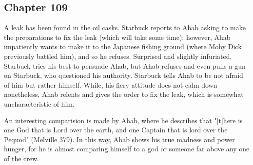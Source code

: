 \subsection{Chapter 109}

A leak has been found in the oil casks. Starbuck reports to Ahab asking
to make the preparations to fix the leak (which will take some time); however,
Ahab impatiently wants to make it to the Japanese fishing ground (where Moby
Dick previously battled him), and so he refuses. Surprised and slightly
infuriated, Starbuck tries his best to persuade Ahab, but Ahab refuses and even
pulls a gun on Starbuck, who questioned his authority. Starbuck tells Ahab to
be not afraid of him but rather himself. While, his fiery attitude does not
calm down nonetheless, Ahab relents and gives the order to fix the leak, which
is somewhat uncharacteristic of him.

An interesting comparision is made by Ahab, where he describes that "[t]here is
one God that is Lord over the earth, and one Captain that is lord over the
Pequod" (Melville 379). In this way, Ahab shows his true madness and power
hunger, for he is almost comparing himself to a god or someone far above any
one of the crew.
